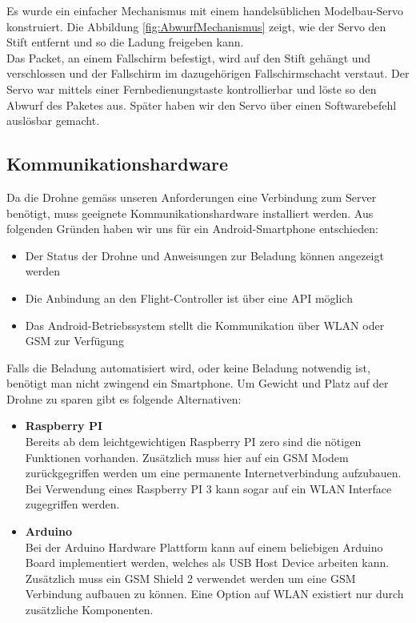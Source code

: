 Es wurde ein einfacher Mechanismus mit einem handelsüblichen Modelbau-Servo konstruiert. Die Abbildung \ref{fig:AbwurfMechanismus} zeigt, wie der Servo den Stift entfernt und so die Ladung freigeben kann. \\
Das Packet, an einem Fallschirm befestigt, wird auf den Stift gehängt und verschlossen und der Fallschirm im dazugehörigen Fallschirmschacht verstaut. Der Servo war mittels einer Fernbedienungstaste kontrollierbar und löste so den Abwurf des Paketes aus. Später haben wir den Servo über einen Softwarebefehl auslösbar gemacht. 

\subsection{Kommunikationshardware}
Da die Drohne gemäss unseren Anforderungen eine Verbindung zum Server benötigt, muss geeignete Kommunikationshardware installiert werden. Aus folgenden Gründen haben wir uns für ein Android-Smartphone entschieden:
\begin{itemize}
	\item{Der Status der Drohne und Anweisungen zur Beladung können angezeigt werden}
	\item{Die Anbindung an den Flight-Controller ist über eine API möglich}
	\item{Das Android-Betriebssystem stellt die Kommunikation über WLAN oder GSM zur Verfügung}
\end{itemize}

Falls die Beladung automatisiert wird, oder keine Beladung notwendig ist, benötigt man nicht zwingend ein Smartphone. Um Gewicht und Platz auf der Drohne zu sparen gibt es folgende Alternativen:
\begin{itemize}
	\item{\textbf{Raspberry PI} \\
	Bereits ab dem leichtgewichtigen Raspberry PI zero sind die nötigen Funktionen vorhanden. Zusätzlich muss hier auf ein GSM Modem zurückgegriffen werden um eine permanente Internetverbindung aufzubauen. Bei Verwendung eines Raspberry PI 3 kann sogar auf ein WLAN Interface zugegriffen werden.
	}
	\item{\textbf{Arduino} \\
	Bei der Arduino Hardware Plattform kann auf einem beliebigen Arduino Board implementiert werden, welches als USB Host Device arbeiten kann. Zusätzlich muss ein GSM Shield 2 verwendet werden um eine GSM Verbindung aufbauen zu können. Eine Option auf WLAN existiert nur durch zusätzliche Komponenten.}
\end{itemize}

